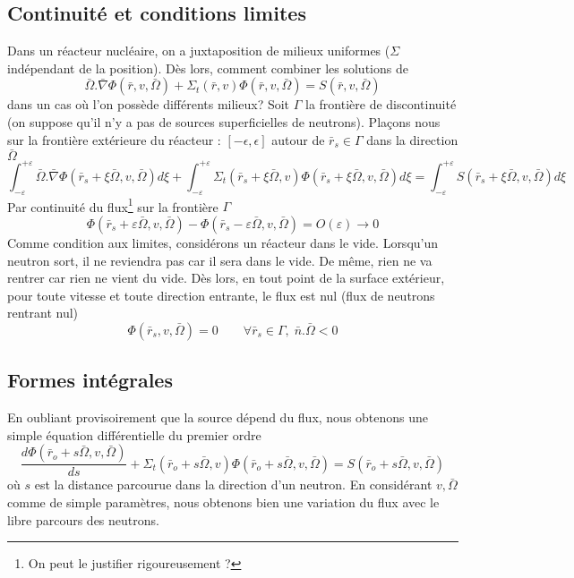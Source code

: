 \subsection{Continuité et conditions limites}
Dans un réacteur nucléaire, on a juxtaposition de milieux uniformes ($\Sigma$ indépendant de la 
position). Dès lors, comment combiner les solutions de
\begin{equation}
\bar \Omega .\bar \nabla \varPhi (\bar r,v,\bar \Omega ) + {\Sigma _t}(\bar r,v)\varPhi (\bar r,v,\bar \Omega ) = S(\bar r,v,\bar \Omega )
\end{equation}
dans un cas où l'on possède différents milieux? Soit $\Gamma$ la frontière de discontinuité (on 
suppose qu'il n'y a pas de sources superficielles de neutrons). Plaçons nous sur la frontière 
extérieure du réacteur : $[-\epsilon,\epsilon]$ autour de $\bar r_s\in\Gamma$ dans la direction 
$\bar\Omega$
\begin{equation}
\int_{ - \varepsilon }^{ + \varepsilon }    \bar \Omega .\bar \nabla \varPhi ({\bar r_s} + \xi \bar \Omega ,v,\bar \Omega )d\xi  + \int_{ - \varepsilon }^{ + \varepsilon }    {\Sigma _t}({\bar r_s} + \xi \bar \Omega ,v)\varPhi ({\bar r_s} + \xi \bar \Omega ,v,\bar \Omega )d\xi  = \int_{ - \varepsilon }^{ + \varepsilon }    S({\bar r_s} + \xi \bar \Omega ,v,\bar \Omega )d\xi 
\end{equation}
Par continuité du flux\footnote{On peut le justifier rigoureusement ?} sur la frontière $\Gamma$
\begin{equation}
\varPhi ({\bar r_s} + \varepsilon \bar \Omega ,v,\bar \Omega ) - \varPhi ({\bar r_s} - \varepsilon \bar \Omega ,v,\bar \Omega ) = O(\varepsilon ) \rightarrow 0
\end{equation}
Comme condition aux limites, considérons un réacteur dans le vide. Lorsqu'un neutron sort, il ne 
reviendra pas car il sera dans le vide. De même, rien ne va rentrer car rien ne vient du vide. Dès 
lors, en tout point de la surface extérieur, pour toute vitesse et toute direction entrante, le 
flux est nul (flux de neutrons rentrant nul)
\begin{equation}
\varPhi ({\bar r_s},v,\bar \Omega ) = 0\quad \quad \forall {\bar r_s} \in \Gamma ,\;\bar n.\bar \Omega  < 0
\end{equation}

\subsection{Formes intégrales}
En oubliant provisoirement que la source dépend du flux, nous obtenons une simple équation 
différentielle du premier ordre
\begin{equation}
\frac{{d\varPhi ({{\bar r}_o} + s\bar \Omega ,v,\bar \Omega )}}{{ds}} + {\Sigma _t}({\bar r_o} + s\bar \Omega ,v)\varPhi ({\bar r_o} + s\bar \Omega ,v,\bar \Omega ) = S({\bar r_o} + s\bar \Omega ,v,\bar \Omega )
\end{equation}
où $s$ est la distance parcourue dans la direction d'un neutron. En considérant $v, \bar\Omega$ comme 
de simple paramètres, nous obtenons bien une variation du flux avec le libre parcours des neutrons.\\

